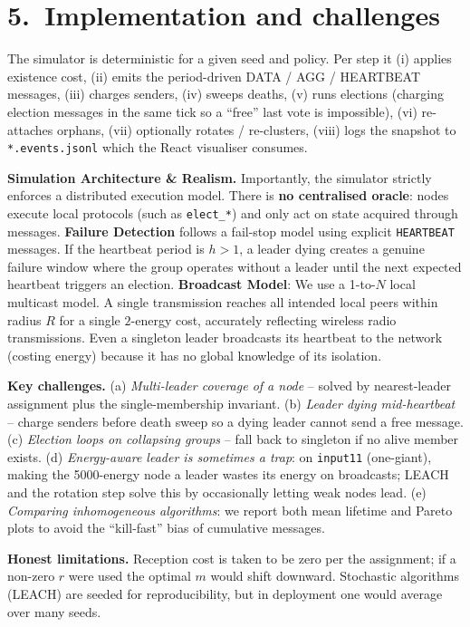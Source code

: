 \documentclass[a4paper,10pt]{article}
\begin{document}
\vspace{-0.6em}
\section*{5.\ Implementation and challenges}
\vspace{-0.4em}
The simulator is deterministic for a given seed and policy.  Per step
it (i) applies existence cost, (ii) emits the period-driven DATA / AGG
/ HEARTBEAT messages, (iii) charges senders, (iv) sweeps deaths,
(v) runs elections (charging election messages in the same tick so a
``free'' last vote is impossible), (vi) re-attaches orphans,
(vii) optionally rotates / re-clusters, (viii) logs the snapshot to
\texttt{*.events.jsonl} which the React visualiser consumes.

\textbf{Simulation Architecture \& Realism.}
Importantly, the simulator strictly enforces a distributed execution model. There is \textbf{no centralised oracle}: nodes execute local protocols (such as \texttt{elect\_*}) and only act on state acquired through messages. 
\textbf{Failure Detection} follows a fail-stop model using explicit \texttt{HEARTBEAT} messages. If the heartbeat period is $h > 1$, a leader dying creates a genuine failure window where the group operates without a leader until the next expected heartbeat triggers an election.
\textbf{Broadcast Model}: We use a 1-to-$N$ local multicast model. A single transmission reaches all intended local peers within radius $R$ for a single $2$-energy cost, accurately reflecting wireless radio transmissions. Even a singleton leader broadcasts its heartbeat to the network (costing energy) because it has no global knowledge of its isolation.

\textbf{Key challenges.}
(a) \emph{Multi-leader coverage of a node} -- solved by nearest-leader
assignment plus the single-membership invariant.
(b) \emph{Leader dying mid-heartbeat} -- charge senders before death
sweep so a dying leader cannot send a free message.
(c) \emph{Election loops on collapsing groups} -- fall back to singleton
if no alive member exists.
(d) \emph{Energy-aware leader is sometimes a trap}: on \texttt{input11}
(one-giant), making the 5000-energy node a leader wastes its energy on
broadcasts; LEACH and the rotation step solve this by occasionally
letting weak nodes lead.
(e) \emph{Comparing inhomogeneous algorithms}: we report both mean
lifetime and Pareto plots to avoid the ``kill-fast'' bias of cumulative
messages.

\textbf{Honest limitations.}  Reception cost is taken to be zero per
the assignment; if a non-zero $r$ were used the optimal $m$ would shift
downward.  Stochastic algorithms (LEACH) are seeded for reproducibility,
but in deployment one would average over many seeds.
\end{document}
